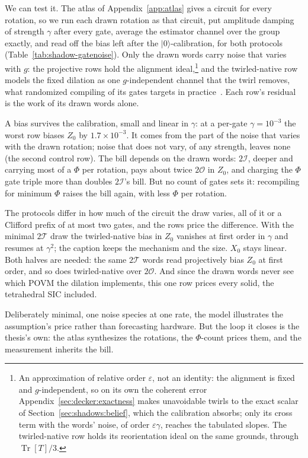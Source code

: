 \documentclass[11pt, oneside, openany]{scrbook}
\DeclareMathOperator{\Tr}{Tr}
\newcommand{\Tgroup}{\mathcal{T}}  %
\newcommand{\Ogroup}{\mathcal{O}}  %
\newcommand{\Igroup}{\mathcal{I}}  %
\newcommand{\TwoT}{2\Tgroup}
\newcommand{\TwoO}{2\Ogroup}
\newcommand{\TwoI}{2\Igroup}
\newcommand{\ket}[1]{|#1\rangle}
\begin{document}
We can test it. The atlas of Appendix~\ref{app:atlas} gives a circuit for every rotation, so we run each drawn rotation as that circuit, put amplitude damping of strength $\gamma$ after every gate, average the estimator channel over the group exactly, and read off the bias left after the $\ket{0}$-calibration, for both protocols (Table~\ref{tab:shadow-gatenoise}). Only the drawn words carry noise that varies with $g$: the projective rows hold the alignment ideal,\footnote{An approximation of relative order $\varepsilon$, not an identity: the alignment is fixed and $g$-independent, so on its own the coherent error Appendix~\ref{sec:decker:exactness} makes unavoidable twirls to the exact scalar of Section~\ref{sec:shadows:belief}, which the calibration absorbs; only its cross term with the words' noise, of order $\varepsilon\gamma$, reaches the tabulated slopes. The twirled-native row holds its reorientation ideal on the same grounds, through $\Tr[T]/3$.} and the twirled-native row models the fixed dilation as one $g$-independent channel that the twirl removes, what randomized compiling of its gates targets in practice~\cite{ivashkov2024highfidelitymultiqubitgeneralized}. Each row's residual is the work of its drawn words alone.

A bias survives the calibration, small and linear in $\gamma$: at a per-gate $\gamma = 10^{-3}$ the worst row biases $Z_0$ by $1.7 \times 10^{-3}$. It comes from the part of the noise that varies with the drawn rotation; noise that does not vary, of any strength, leaves none (the second control row). The bill depends on the drawn words: $\TwoI$, deeper and carrying most of a $\Phi$ per rotation, pays about twice $\TwoO$ in $Z_0$, and charging the $\Phi$ gate triple more than doubles $\TwoI$'s bill. But no count of gates sets it: recompiling for minimum $\Phi$ raises the bill again, with less $\Phi$ per rotation.

The protocols differ in how much of the circuit the draw varies, all of it or a Clifford prefix of at most two gates, and the rows price the difference. With the minimal $\TwoT$ draw the twirled-native bias in $Z_0$ vanishes at first order in $\gamma$ and resumes at $\gamma^2$; the caption keeps the mechanism and the size. $X_0$ stays linear. Both halves are needed: the same $\TwoT$ words read projectively bias $Z_0$ at first order, and so does twirled-native over $\TwoO$. And since the drawn words never see which POVM the dilation implements, this one row prices every solid, the tetrahedral SIC included.



Deliberately minimal, one noise species at one rate, the model illustrates the assumption's price rather than forecasting hardware. But the loop it closes is the thesis's own: the atlas synthesizes the rotations, the $\Phi$-count prices them, and the measurement inherits the bill.
\end{document}
